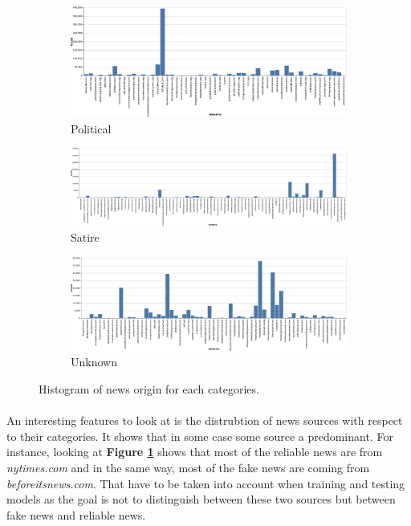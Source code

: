 \begin{figure}\ContinuedFloat
    \begin{subfigure}[b]{1\textwidth}
         \centering
         \includegraphics[width=\textwidth]{images/data_exploration/political.eps}
         \caption{Political}
     \end{subfigure}
     \vfill
     \begin{subfigure}[b]{1\textwidth}
         \centering
         \includegraphics[width=\textwidth]{images/data_exploration/satire.eps}
         \caption{Satire}
     \end{subfigure}
     \vfill
     \begin{subfigure}[b]{1\textwidth}
         \centering
         \includegraphics[width=\textwidth]{images/data_exploration/unknown.eps}
         \caption{Unknown}
     \end{subfigure}
        \caption{Histogram of news origin for each categories.}
        \label{fig:data_explo:source}
\end{figure}

\paragraph{} An interesting features to look at is the distrubtion of news sources with respect to their categories. It shows that in some case some source a predominant. For instance, looking at \textbf{Figure \ref{fig:data_explo:source}} shows that most of the reliable news are from \textit{nytimes.com} and in the same way, most of the fake news are coming from \textit{beforeitsnews.com}. That have to be taken into account when training and testing models as the goal is not to distinguish between these two sources but between fake news and reliable news. 


